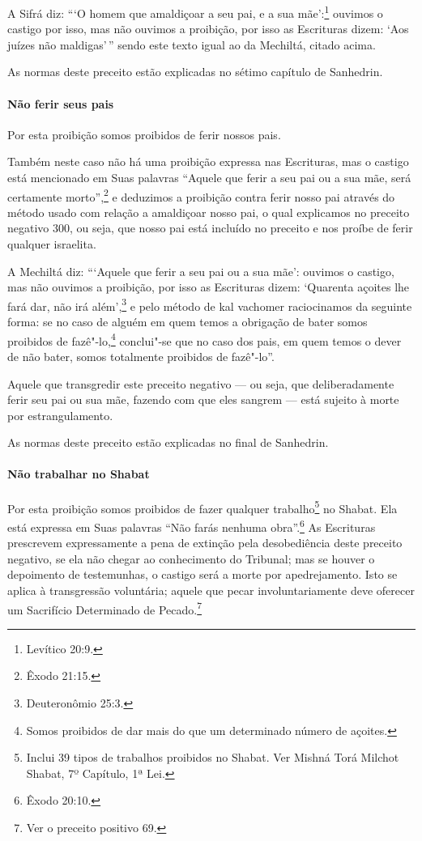 \begin{multicols}{2}
A Sifrá\starr{} diz: ```O homem que amaldiçoar a seu pai, e a sua mãe':\footnote{Levítico
20:9.} ouvimos o castigo por isso, mas não ouvimos a proibição, por isso
as Escrituras dizem: `Aos juízes não maldigas'\,'' sendo este texto igual
ao da Mechiltá\starr, citado acima.

As normas deste preceito estão explicadas no sétimo capítulo de Sanhedrin\starr.

\paragraph{Não ferir seus pais}

Por esta proibição somos proibidos de ferir nossos pais.

Também neste caso não há uma proibição expressa nas Escrituras, mas o
castigo está mencionado em Suas palavras ``Aquele que ferir a seu pai ou
a sua mãe, será certamente morto'',\footnote{Êxodo 21:15.} e deduzimos a
proibição contra ferir nosso pai através do método usado com relação a
amaldiçoar nosso pai, o qual explicamos no preceito negativo 300, ou
seja, que nosso pai está incluído no preceito e nos proíbe de ferir
qualquer israelita.

A Mechiltá\starr{} diz: ```Aquele que ferir a seu pai ou a sua mãe': ouvimos o
castigo, mas não ouvimos a proibição, por isso as Escrituras dizem:
`Quarenta açoites lhe fará dar, não irá além',\footnote{Deuteronômio 25:3.} e
pelo método de kal vachomer\starr{} raciocinamos da
seguinte forma: se no caso de alguém em quem temos a obrigação de bater
somos proibidos de fazê"-lo,\footnote{Somos proibidos de dar mais do que um determinado número de açoites.} conclui"-se que no caso
dos pais, em quem temos o dever de não bater, somos totalmente
proibidos de fazê"-lo''.

Aquele que transgredir este preceito negativo --- ou seja, que deliberadamente ferir seu pai ou sua mãe, fazendo com que eles sangrem --- está sujeito à morte por estrangulamento.

As normas deste preceito estão explicadas no final de Sanhedrin\starr.

\paragraph{Não trabalhar no Shabat}

Por esta proibição somos proibidos de fazer qualquer
trabalho\footnote{Inclui 39 tipos de trabalhos proibidos no Shabat. Ver Mishná\starr{} Torá\starr{}
  Milchot Shabat, 7º Capítulo, 1ª Lei.} no Shabat. Ela está expressa em Suas
palavras ``Não farás nenhuma obra''.\footnote{Êxodo 20:10.} As Escrituras
prescrevem expressamente a pena de extinção pela desobediência deste
preceito negativo, se ela não chegar ao conhecimento do Tribunal; mas se
houver o depoimento de testemunhas, o castigo será a morte por
apedrejamento. Isto se aplica à transgressão voluntária; aquele que
pecar involuntariamente deve oferecer um Sacrifício Determinado de
Pecado.\footnote{Ver o preceito positivo 69.}


\end{multicols}
